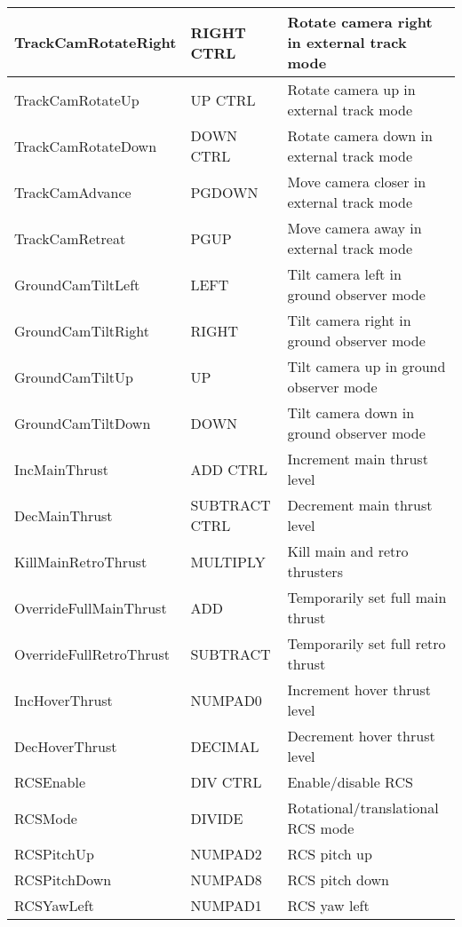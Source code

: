 \documentclass[Orbiter Developer Manual.tex]{subfiles}
\begin{document}
\begin{longtable}{ |p{}|p{}|p{}| }
	\hline\rule{0pt}{2ex}
	TrackCamRotateRight & RIGHT CTRL & Rotate camera right in external track mode\\
	\hline\rule{0pt}{2ex}
	TrackCamRotateUp & UP CTRL & Rotate camera up in external track mode\\
	\hline\rule{0pt}{2ex}
	TrackCamRotateDown & DOWN CTRL & Rotate camera down in external track mode\\
	\hline\rule{0pt}{2ex}
	TrackCamAdvance & PGDOWN & Move camera closer in external track mode\\
	\hline\rule{0pt}{2ex}
	TrackCamRetreat & PGUP & Move camera away in external track mode\\
	\hline\rule{0pt}{2ex}
	GroundCamTiltLeft & LEFT & Tilt camera left in ground observer mode\\
	\hline\rule{0pt}{2ex}
	GroundCamTiltRight & RIGHT & Tilt camera right in ground observer mode\\
	\hline\rule{0pt}{2ex}
	GroundCamTiltUp & UP & Tilt camera up in ground observer mode\\
	\hline\rule{0pt}{2ex}
	GroundCamTiltDown & DOWN & Tilt camera down in ground observer mode\\
	\hline\rule{0pt}{2ex}
	IncMainThrust & ADD CTRL & Increment main thrust level\\
	\hline\rule{0pt}{2ex}
	DecMainThrust & SUBTRACT CTRL & Decrement main thrust level\\
	\hline\rule{0pt}{2ex}
	KillMainRetroThrust & MULTIPLY & Kill main and retro thrusters\\
	\hline\rule{0pt}{2ex}
	OverrideFullMainThrust & ADD & Temporarily set full main thrust\\
	\hline\rule{0pt}{2ex}
	OverrideFullRetroThrust & SUBTRACT & Temporarily set full retro thrust\\
	\hline\rule{0pt}{2ex}
	IncHoverThrust & NUMPAD0 & Increment hover thrust level\\
	\hline\rule{0pt}{2ex}
	DecHoverThrust & DECIMAL & Decrement hover thrust level\\
	\hline\rule{0pt}{2ex}
	RCSEnable & DIV CTRL & Enable/disable RCS\\
	\hline\rule{0pt}{2ex}
	RCSMode & DIVIDE & Rotational/translational RCS mode\\
	\hline\rule{0pt}{2ex}
	RCSPitchUp & NUMPAD2 & RCS pitch up\\
	\hline\rule{0pt}{2ex}
	RCSPitchDown & NUMPAD8 & RCS pitch down\\
	\hline\rule{0pt}{2ex}
	RCSYawLeft & NUMPAD1 & RCS yaw left\\

\end{longtable}
\end{document}

